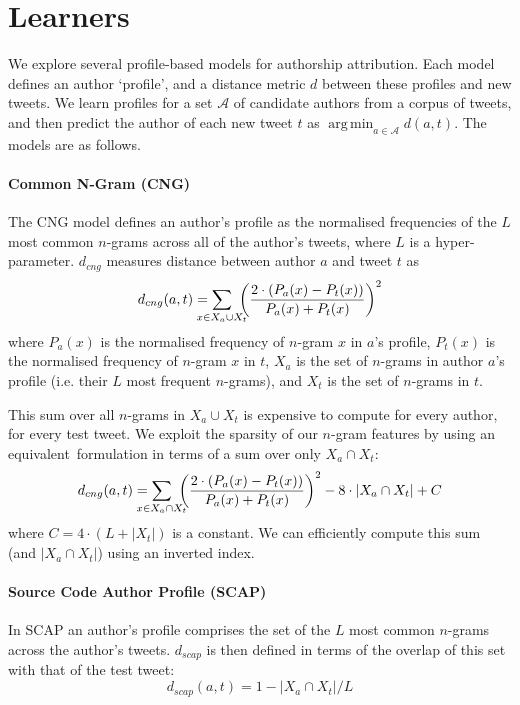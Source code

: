 \documentclass[twocolumn,10pt]{article}
\DeclareMathOperator*{\argmin}{arg\,min}
\begin{document}
\section{Learners}

We explore several profile-based models for authorship attribution.
Each model defines an author  `profile', and a distance metric $d$
between these profiles and new tweets.
We learn profiles for a set $\mathcal{A}$ of candidate authors from
a corpus of tweets, and then predict the author of each new tweet
$t$ as $\argmin_{a \in \mathcal{A}} d(a, t)$.
The models are as follows.

\paragraph{Common N-Gram (CNG)}
The CNG model\supercite{kevselj2003n} defines an author's profile
as the normalised frequencies of the $L$ most common $n$-grams
across all of the author's tweets, where $L$ is a hyper-parameter.
$d_{cng}$ measures distance between author $a$ and tweet $t$ as
$$
d_{cng}(a, t) =
    \smashoperator{\sum_{x \in X_a \cup X_t}}\ 
        {\left ( \frac{2 \cdot (P_a(x) - P_t(x))}{P_a(x) + P_t(x)} \right )}^2
$$
where $P_a(x)$ is the normalised frequency of $n$-gram $x$ in
$a$'s profile, $P_t(x)$ is the normalised frequency of $n$-gram
$x$ in $t$, $X_a$ is the set of $n$-grams in author $a$'s profile
(i.e. their $L$ most frequent $n$-grams), and $X_t$ is the set
of $n$-grams in $t$.

This sum over all $n$-grams in $X_a \cup X_t$ is expensive
to compute for every author, for every test tweet.
We exploit the sparsity of our $n$-gram features by using
an equivalent\footnotemark~formulation in terms of a sum over
only $X_a \cap X_t$:
$$
d_{cng} (a, t) =
    \smashoperator{\sum_{x \in X_a \cap X_t}}\ 
        {\left ( \frac{2 \cdot (P_a(x) - P_t(x))}{P_a(x) + P_t(x)} \right )}^2
        - 8 \cdot |X_a \cap X_t| + C
$$
where $C=4 \cdot (L + |X_t|)$ is a constant.
We can efficiently compute this sum (and $|X_a \cap X_t|$)
using an inverted index.

\paragraph{Source Code Author Profile (SCAP)} In SCAP\supercite{frantzeskou2006effective}
an author's profile comprises the set of the $L$ most common
$n$-grams across the author's tweets. $d_{scap}$ is then defined in
terms of the overlap of this set with that of the test tweet:
$$
d_{scap}(a, t) = 1 - |X_a \cap X_t| / L     %
$$
\end{document}
